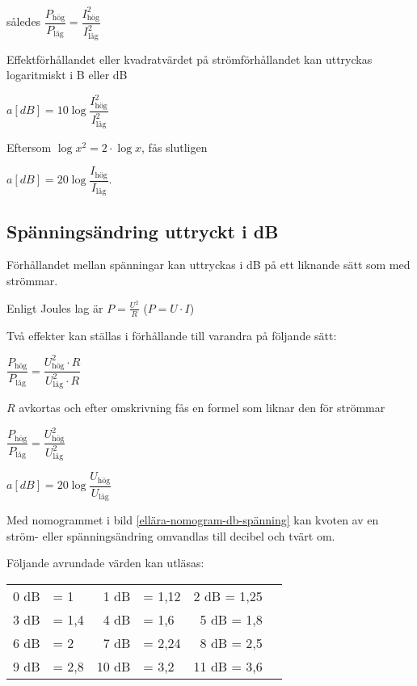 således \(\dfrac{P_\text{hög}}{P_\text{låg}} = \dfrac{I_\text{hög}^2}{I_\text{låg}^2}\)

Effektförhållandet eller kvadratvärdet på strömförhållandet kan uttryckas
logaritmiskt i B eller dB

\(a[dB] = 10\log \dfrac{I_\text{hög}^2}{I_\text{låg}^2}\)

Eftersom \(\log x^2 = 2 \cdot \log x\), fås slutligen

\(a[dB] = 20\log \dfrac{I_\text{hög}}{I_\text{låg}}\).

\subsection{Spänningsändring uttryckt i dB}

Förhållandet mellan spänningar kan uttryckas i dB på ett liknande sätt som med
strömmar.

Enligt Joules lag är \(P = \frac{U^2}{R}\) (\(P = U \cdot I\))

Två effekter kan ställas i förhållande till varandra på följande sätt:

\(\dfrac{P_\text{hög}}{P_\text{låg}}=\dfrac{U_\text{hög}^2 \cdot R}{U_\text{låg}^2 \cdot R}\)

\(R\) avkortas och efter omskrivning fås en formel som liknar den för strömmar

\(\dfrac{P_\text{hög}}{P_\text{låg}} = \dfrac{U_\text{hög}^2}{U_\text{låg}^2}\)

\(a[dB] = 20\log \dfrac{U_\text{hög}}{U_\text{låg}}\)

Med nomogrammet i bild \ref{ellära-nomogram-db-spänning} kan kvoten av en
ström- eller spänningsändring omvandlas till decibel och tvärt om.


Följande avrundade värden kan utläsas:

\begin{center}
\begin{tabular}{rlrlrl}
0 dB & = 1   &  1 dB & = 1,12 &  2 dB = 1,25 \\
3 dB & = 1,4 &  4 dB & = 1,6  &  5 dB = 1,8 \\
6 dB & = 2   &  7 dB & = 2,24 &  8 dB = 2,5 \\
9 dB & = 2,8 & 10 dB & = 3,2  & 11 dB = 3,6
\end{tabular}
\end{center}

